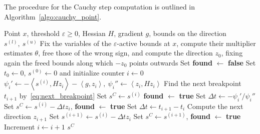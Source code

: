 \documentclass{article}
\numberwithin{equation}{section}
\newcommand{\inner}[2]{\left\langle {#1} , {#2} \right\rangle} %
\theoremstyle{plain}
\begin{document}
The procedure for the Cauchy step computation is outlined in Algorithm~\ref{algo:cauchy_point}.
\begin{algorithm}
	\caption{Cauchy step computation}\label{algo:cauchy_point}
	\begin{algorithmic}[1]
		\Require Point $x$, threshold $\varepsilon \ge 0$, Hessian $H$, gradient $g$, bounds on the direction $s^{(l)},\ s^{(u)}$
		\State Fix the variables of the $\varepsilon$-active bounds at $x$, compute their multiplier estimates $\theta$, free those of the wrong sign, and compute the direction $z_0$, fixing again the freed bounds along which $-z_0$ points outwards
		\State Set \textbf{found} $\gets$ \textbf{false} 
		\State Set $t_0\gets 0$, $s^{(0)}\gets 0$ and initialize counter $i\gets 0$
		\Repeat
		\State $\psi_i' \gets -\inner{s^{(i)}}{Hz_i}-\inner{g}{z_i},\ \psi_i'' \gets \inner{z_i}{Hz_i}$
		\State Find the next breakpoint $t_{i+1}$ by~\eqref{eq:next_breakpoint}
		\State Set $s^C \gets s^{(i)}$
		\State \textbf{found} $\gets$ \textbf{true}
		\State Set $\Delta t \gets - \psi_i'/\psi_i''$
		\State Set $s^C \gets s^{(i)} - \Delta t z_i$, \textbf{found} $\gets$ \textbf{true}
		\Else
		\State Set $\Delta t \gets t_{i+1}-t_i$
		\State Compute the next direction $z_{i+1}$
		\State Set $s^{(i+1)} \gets s^{(i)} - \Delta t z_i$
		\State Set $s^C \gets s^{(i+1)}$, \textbf{found} $\gets$ \textbf{true}
		\EndIf
		\EndIf
		\State Increment $i \gets i+1$
		\State \Return $s^C$
	\end{algorithmic}
\end{algorithm}

				
\end{document}
